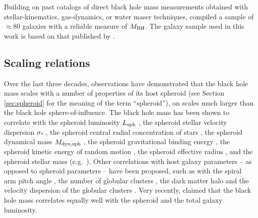 Building on past catalogs of direct black hole mass measurements 
obtained with stellar-kinematics, gas-dynamics, or water maser techniques, 
\cite{grahamscott2013} compiled a sample of $\approx 80$ galaxies with a reliable measure of $M_{\rm BH}$. 
The galaxy sample used in this work is based on that published by \cite{grahamscott2013}.



\subsection{Scaling relations}
Over the last three decades, observations have demonstrated that 
the black hole mass scales with a number of properties of its host spheroid 
(see Section \ref{sec:spheroid} for the meaning of the term ``spheroid''), 
on scales much larger than the black hole sphere-of-influence.
The black hole mass has been shown to correlate with 
the spheroid luminosity $L_{\rm sph}$ \citep{dressler1989,kormendyrichstone1995}, 
the spheroid stellar velocity dispersion $\sigma_*$ \citep{ferraresemerritt2000,gebhardt2000}, 
the spheroid central radial concentration of stars \citep{graham2001,grahamdriver2007}, 
the spheroid dynamical mass $M_{\rm dyn,sph}$ \citep{magorrian1998,marconihunt2003,haringrix2004}, 
the spheroid gravitational binding energy \citep{allerrichstone2007}, 
the spheroid kinetic energy of random motion \citep{feolimele2005,feolimancini2009},
the spheroid effective radius \citep{sani2011}, 
and the spheroid stellar mass (e.g.~\citealt{magorrian1998,sani2011,beifiori2012,scott2013}).
Other correlations with host galaxy parameters  -- as opposed to spheroid parameters -- have been proposed, such as with
the spiral arm pitch angle \citep{seigar2008,berrier2013}, 
the number of globular clusters \citep{burkerttremaine2010,snyder2011},
the dark matter halo \citep{ferrarese2002}
and the velocity dispersion of the globular clusters \citep{sadouncolin2012,pota2013}. 
Very recently, \cite{lasker2014anal} claimed that the black hole mass correlates equally well with the spheroid and 
the total galaxy luminosity. \\

